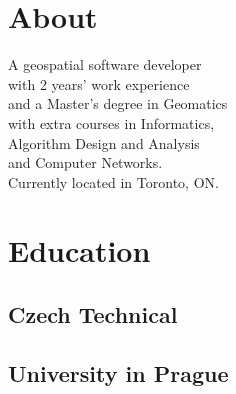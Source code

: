 \documentclass[letterpaper]{deedy-resume} %
\begin{document}
\begin{minipage}[t]{0.33\textwidth} %


\section{About} 

A geospatial software developer \\ 
with 2 years' work experience \\ 
and a Master's degree in Geomatics \\ 
with extra courses in Informatics, \\ 
Algorithm Design and Analysis \\
and Computer Networks. \\
Currently located in Toronto, ON.

\sectionspace %



\section{Education} 

\subsection{Czech Technical}
\subsection{University in Prague}


\sectionspace %



\sectionspace %


%
%


\end{minipage}
\end{document}
